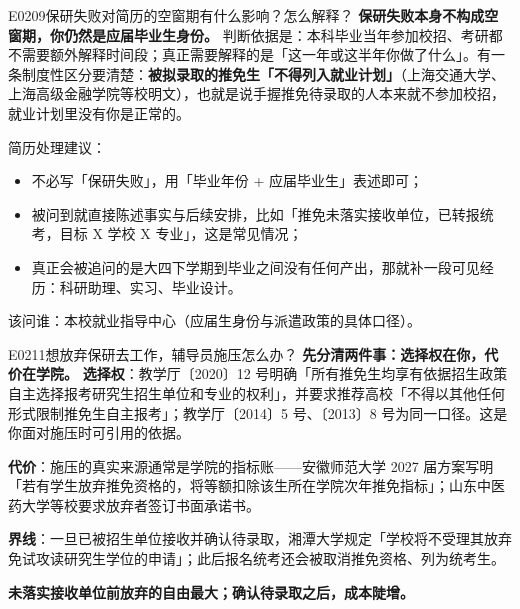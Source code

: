 \begin{qa}{E0209}{保研失败对简历的空窗期有什么影响？怎么解释？}
\textbf{保研失败本身不构成空窗期，你仍然是应届毕业生身份。}
判断依据是：本科毕业当年参加校招、考研都不需要额外解释时间段；真正需要解释的是「这一年或这半年你做了什么」。有一条制度性区分要清楚：\textbf{被拟录取的推免生「不得列入就业计划」}（上海交通大学、上海高级金融学院等校明文），也就是说手握推免待录取的人本来就不参加校招，就业计划里没有你是正常的。

简历处理建议：
\begin{itemize}
  \item 不必写「保研失败」，用「毕业年份 + 应届毕业生」表述即可；
  \item 被问到就直接陈述事实与后续安排，比如「推免未落实接收单位，已转报统考，目标 X 学校 X 专业」，这是常见情况；
  \item 真正会被追问的是大四下学期到毕业之间没有任何产出，那就补一段可见经历：科研助理、实习、毕业设计。
\end{itemize}

该问谁：本校就业指导中心（应届生身份与派遣政策的具体口径）。
\end{qa}

\begin{qa}{E0211}{想放弃保研去工作，辅导员施压怎么办？}
\textbf{先分清两件事：选择权在你，代价在学院。}
\textbf{选择权}：教学厅〔2020〕12 号明确「所有推免生均享有依据招生政策自主选择报考研究生招生单位和专业的权利」，并要求推荐高校「不得以其他任何形式限制推免生自主报考」；教学厅〔2014〕5 号、〔2013〕8 号为同一口径。这是你面对施压时可引用的依据。

\textbf{代价}：施压的真实来源通常是学院的指标账——安徽师范大学 2027 届方案写明「若有学生放弃推免资格的，将等额扣除该生所在学院次年推免指标」；山东中医药大学等校要求放弃者签订书面承诺书。

\textbf{界线}：一旦已被招生单位接收并确认待录取，湘潭大学规定「学校将不受理其放弃免试攻读研究生学位的申请」；此后报名统考还会被取消推免资格、列为统考生。

\textbf{未落实接收单位前放弃的自由最大；确认待录取之后，成本陡增。}
\end{qa}

